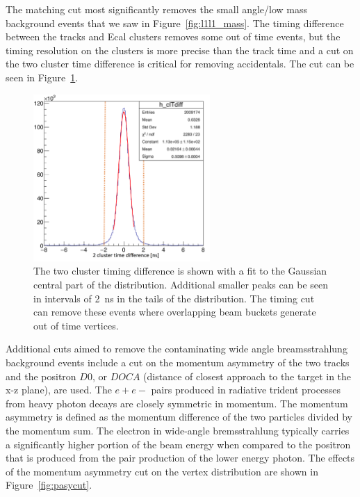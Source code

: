 The matching cut most significantly removes the small angle/low mass background events that we saw in Figure~\ref{fig:l1l1_mass}. The timing difference between the tracks and Ecal clusters removes some out of time events, but the timing resolution on the clusters is more precise than the track time and a cut on the two cluster time difference is critical for removing accidentals. The cut can be seen in Figure~\ref{fig:cltdiff}.

\begin{figure}[H]
  \centering
      \includegraphics[width=0.6\textwidth]{plots/cltdiff.png}
  \caption{The two cluster timing difference is shown with a fit to the Gaussian central part of the distribution. Additional smaller peaks can be seen in intervals of 2~ns in the tails of the distribution. The timing cut can remove these events where overlapping beam buckets generate out of time vertices.}
  \label{fig:cltdiff}
\end{figure} 

Additional cuts aimed to remove the contaminating wide angle breamsstrahlung background events include a cut on the momentum asymmetry of the two tracks and the positron $D0$, or $DOCA$ (distance of closest approach to the target in the x-z plane), are used. The $e+e-$ pairs produced in radiative trident processes from heavy photon decays are closely symmetric in momentum. The momentum asymmetry is defined as the momentum difference of the two particles divided by the momentum sum. The electron in wide-angle bremsstrahlung typically carries a significantly higher portion of the beam energy when compared to the positron that is produced from the pair production of the lower energy photon. The effects of the momentum asymmetry cut on the vertex distribution are shown in Figure~\ref{fig:pasycut}.

